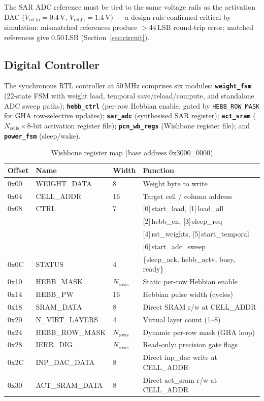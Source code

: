 \documentclass[journal,10pt,twoside]{IEEEtran}
\begin{document}
The SAR ADC reference must be tied to the same voltage rails as the
activation DAC ($V_\text{ref,lo} = 0.4\,\text{V}$,
$V_\text{ref,hi} = 1.4\,\text{V}$) — a design rule confirmed critical by
simulation: mismatched references produce $>44\,\text{LSB}$ round-trip error;
matched references give 0.50\,LSB (Section~\ref{sec:circuit}).

\subsection{Digital Controller}
\label{sec:digital}

The synchronous RTL controller at 50\,MHz comprises six modules:
\textbf{\texttt{weight\_fsm}} (22-state FSM with weight load, temporal
save/reload/compute, and standalone ADC sweep paths);
\textbf{\texttt{hebb\_ctrl}} (per-row Hebbian enable, gated by
\texttt{HEBB\_ROW\_MASK} for GHA row-selective updates);
\textbf{\texttt{sar\_adc}} (synthesised SAR register);
\textbf{\texttt{act\_sram}} ($N_\text{cells} \times 8$-bit activation
register file);
\textbf{\texttt{pcn\_wb\_regs}} (Wishbone register file);
and \textbf{\texttt{power\_fsm}} (sleep/wake).

\begin{table}[t]
\caption{Wishbone register map (base address 0x3000\_0000)}
\label{tab:regmap}
\centering
\footnotesize
\begin{tabular}{lllP{2.7cm}}
\toprule
Offset & Name & Width & Function \\
\midrule
0x00 & WEIGHT\_DATA & 8 & Weight byte to write \\
0x04 & CELL\_ADDR & 16 & Target cell / column address \\
0x08 & CTRL & 7 & [0]\,start\_load, [1]\,load\_all \\
     &      &   & [2]\,hebb\_en, [3]\,sleep\_req \\
     &      &   & [4]\,rst\_weights, [5]\,start\_temporal \\
     &      &   & [6]\,start\_adc\_sweep \\
0x0C & STATUS & 4 & \{sleep\_ack, hebb\_actv, busy, ready\} \\
0x10 & HEBB\_MASK & $N_\text{rows}$ & Static per-row Hebbian enable \\
0x14 & HEBB\_PW & 16 & Hebbian pulse width (cycles) \\
0x18 & SRAM\_DATA & 8 & Direct SRAM r/w at CELL\_ADDR \\
0x20 & N\_VIRT\_LAYERS & 4 & Virtual layer count (1--8) \\
0x24 & HEBB\_ROW\_MASK & $N_\text{rows}$ & Dynamic per-row mask (GHA loop) \\
0x28 & IERR\_DIG & $N_\text{rows}$ & Read-only: precision gate flags \\
0x2C & INP\_DAC\_DATA & 8 & Direct inp\_dac write at CELL\_ADDR \\
0x30 & ACT\_SRAM\_DATA & 8 & Direct act\_sram r/w at CELL\_ADDR \\
\bottomrule
\end{tabular}
\end{table}
\end{document}
